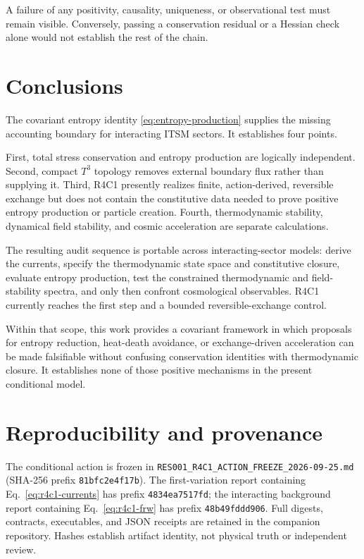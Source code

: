\documentclass[aps,prd,reprint,superscriptaddress,nofootinbib,floatfix]{revtex4-2}
\newcommand{\Tthree}{T^{3}}
\begin{document}
A failure of any positivity, causality, uniqueness, or observational test must
remain visible.  Conversely, passing a conservation residual or a Hessian
check alone would not establish the rest of the chain.

\section{Conclusions}
\label{sec:conclusions}

The covariant entropy identity
\eqref{eq:entropy-production} supplies the missing accounting boundary for
interacting ITSM sectors.  It establishes four points.

First, total stress conservation and entropy production are logically
independent.  Second, compact \(\Tthree\) topology removes external boundary
flux rather than supplying it.  Third, R4C1 presently realizes finite,
action-derived, reversible exchange but does not contain the constitutive data
needed to prove positive entropy production or particle creation.  Fourth,
thermodynamic stability, dynamical field stability, and cosmic acceleration
are separate calculations.

The resulting audit sequence is portable across interacting-sector models:
derive the currents, specify the thermodynamic state space and constitutive
closure, evaluate entropy production, test the constrained thermodynamic and
field-stability spectra, and only then confront cosmological observables.
R4C1 currently reaches the first step and a bounded reversible-exchange
control.

Within that scope, this work provides a covariant framework in which proposals
for entropy reduction, heat-death avoidance, or exchange-driven acceleration
can be made falsifiable without confusing conservation identities with
thermodynamic closure.  It establishes none of those positive mechanisms in
the present conditional model.

\section*{Reproducibility and provenance}

The conditional action is frozen in
\texttt{RES001\_R4C1\_ACTION\_FREEZE\_2026-09-25.md}
(SHA-256 prefix \texttt{81bfc2e4f17b}).  The first-variation report containing
Eq.~\eqref{eq:r4c1-currents} has prefix \texttt{4834ea7517fd}; the interacting
background report containing Eq.~\eqref{eq:r4c1-frw} has prefix
\texttt{48b49fddd906}.  Full digests, contracts, executables, and JSON receipts
are retained in the companion repository.  Hashes establish artifact identity,
not physical truth or independent review.
\end{document}
